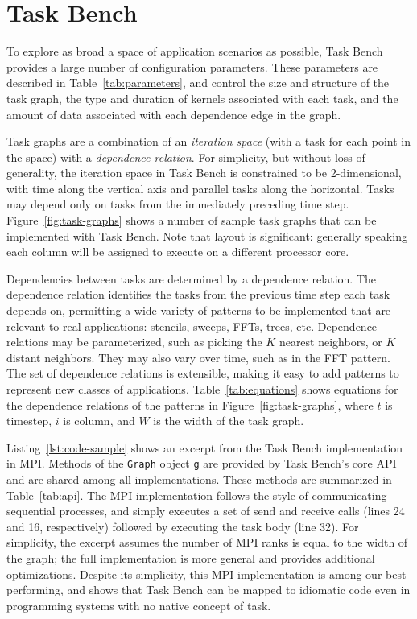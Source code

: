 \section{Task Bench}
\label{sec:task-bench}



To explore as broad a space of application scenarios as possible, Task
Bench provides a large number of configuration parameters. These
parameters are described in
Table~\ref{tab:parameters}, and control the size and
structure of the task graph, the type and duration of kernels
associated with each task, and the amount of data associated with
each dependence edge in the graph.

Task graphs are a combination of an \emph{iteration space} (with a task for
each point in the space) with a \emph{dependence relation}.
For simplicity, but without loss of generality, the iteration space in
Task Bench is constrained to be 2-dimensional, with time along
the vertical axis and parallel tasks along the
horizontal. Tasks may depend only on tasks from the immediately
preceding time step. Figure~\ref{fig:task-graphs} shows a number of sample task
graphs that can be implemented with Task Bench. Note that layout is
significant: generally speaking each column will be
assigned to execute on a different processor core.

Dependencies between tasks are determined by a dependence
relation. The
dependence relation identifies the tasks from the
previous time step each task depends on, permitting a wide variety
of patterns to be implemented that are relevant to real
applications: stencils,
sweeps, FFTs, trees, etc. Dependence relations may be
parameterized, such as picking the $K$ nearest neighbors, or $K$
distant neighbors. They may also vary over time, such as in the FFT pattern. The set of dependence relations is extensible, making it easy to add patterns to represent new classes of applications. Table~\ref{tab:equations} shows equations for the
dependence relations of the patterns in Figure~\ref{fig:task-graphs},
where $t$ is timestep, $i$ is column, and $W$ is the width of the task
graph.




Listing~\ref{lst:code-sample} shows an excerpt from the Task Bench
implementation in MPI. Methods of the \lstinline{Graph} object
\lstinline{g} are provided by Task Bench's core API and are shared
among all implementations. These methods are summarized in
Table~\ref{tab:api}. The MPI implementation follows the style of
communicating sequential processes, and simply executes a set of send
and receive calls (lines 24 and 16, respectively) followed by
executing the task body (line 32). For simplicity, the excerpt
assumes the number of MPI ranks is equal to the width of the graph;
the full implementation is more general and provides additional
optimizations. Despite its simplicity, this MPI implementation is
among our best performing, and shows that Task Bench can be mapped to
idiomatic code even in programming systems with no native concept of
task.

